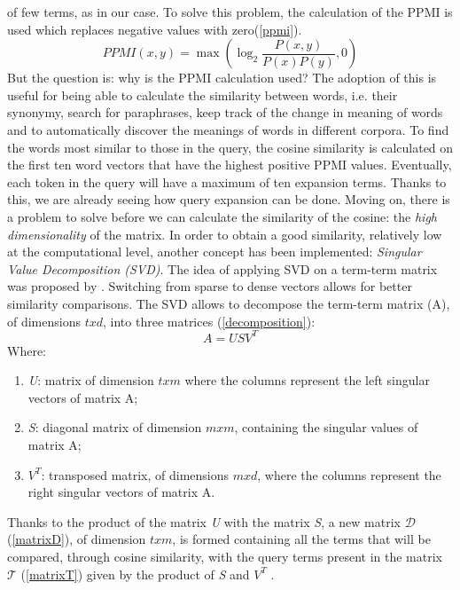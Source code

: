 of few terms, as in our case. To solve this problem, the calculation of the 
PPMI is used which replaces negative values with zero(\ref{ppmi}).
\begin{equation}\label{ppmi}
    PPMI(x,y) = \max(\log_2\frac{P(x,y)}{P(x)P(y)}, 0)
\end{equation}
But the question is: why is the PPMI calculation used? The adoption of 
this is useful for being able to calculate the similarity between words, i.e. 
their synonymy, search for paraphrases, keep track of the change in meaning 
of words and to automatically discover the meanings of words in different 
corpora. To find the words most similar to those in the query, the cosine 
similarity is calculated on the first ten word vectors that have the highest 
positive PPMI values. Eventually, each token in the query will have a maximum 
of ten expansion terms. Thanks to this, we are already seeing how 
query expansion can be done. Moving on, there is a problem to solve before 
we can calculate the similarity of the cosine: the \emph{high dimensionality} 
of the matrix. In order to obtain a good similarity, relatively low at the 
computational level, another concept has been implemented: \emph{Singular Value 
Decomposition (SVD)}. The idea of applying SVD on a term-term matrix was 
proposed by \cite{13}. Switching from sparse to dense vectors allows for better 
similarity comparisons. The SVD allows to decompose the term-term matrix 
(A), of dimensions $txd$, into three matrices \cite{14} (\ref{decomposition}):
\begin{equation}\label{decomposition}
    A = USV^T
\end{equation}
Where:
\begin{enumerate}
    \item \emph{U}: matrix of dimension $txm$ where the columns represent the left 
    singular vectors of matrix A;
    \item \emph{S}: diagonal matrix of dimension $mxm$, containing the singular values 
    of matrix A;
    \item \emph{$V^T$}: transposed matrix, of dimensions $mxd$, where the columns represent 
    the right singular vectors of matrix A.
\end{enumerate}
Thanks to the product of the matrix \emph{U} with the matrix \emph{S}, a new matrix 
\emph{$\mathcal{D}$} (\ref{matrixD}), of dimension $txm$, is formed containing all the terms that will be 
compared, through cosine similarity, with the query terms present in the 
matrix \emph{$\mathcal{T}$} (\ref{matrixT}) given by the product of \emph{S} and $V^T$ .
